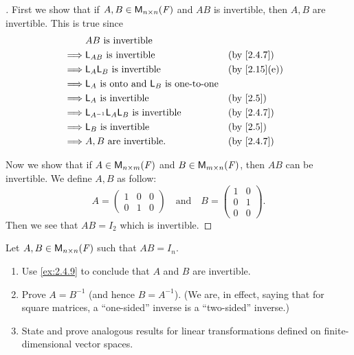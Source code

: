 \begin{proof}[]
  First we show that if \(A, B \in \mathsf{M}_{{n} \times n}({\mathit{F}})\) and \(AB\) is invertible, then \(A, B\) are invertible.
  This is true since
  \begin{align*}
             & AB \text{ is invertible}                                                             \\
    \implies & \L_{AB} \text{ is invertible}                        &  & \text{(by \cref{2.4.7})}   \\
    \implies & \L_A \L_B \text{ is invertible}                      &  & \text{(by \cref{2.15}(e))} \\
    \implies & \L_A \text{ is onto and } \L_B \text{ is one-to-one}                                 \\
    \implies & \L_A \text{ is invertible}                           &  & \text{(by \cref{2.5})}     \\
    \implies & \L_{A^{-1}} \L_A \L_B \text{ is invertible}          &  & \text{(by \cref{2.4.7})}   \\
    \implies & \L_B \text{ is invertible}                           &  & \text{(by \cref{2.5})}     \\
    \implies & A, B \text{ are invertible}.                         &  & \text{(by \cref{2.4.7})}
  \end{align*}

  Now we show that if \(A \in \mathsf{M}_{{n} \times m}({\mathit{F}})\) and \(B \in \mathsf{M}_{{m} \times n}({\mathit{F}})\), then \(AB\) can be invertible.
  We define \(A, B\) as follow:
  \[
    A = \begin{pmatrix}
      1 & 0 & 0 \\
      0 & 1 & 0
    \end{pmatrix} \quad \text{and} \quad B = \begin{pmatrix}
      1 & 0 \\
      0 & 1 \\
      0 & 0
    \end{pmatrix}.
  \]
  Then we see that \(AB = I_2\) which is invertible.
\end{proof}

\begin{ex}\label{ex:2.4.10}
  Let \(A, B \in \mathsf{M}_{{n} \times n}({\mathit{F}})\) such that \(AB = I_n\).
  \begin{enumerate}
    \item Use \cref{ex:2.4.9} to conclude that \(A\) and \(B\) are invertible.
    \item Prove \(A = B^{-1}\) (and hence \(B = A^{-1}\)).
          (We are, in effect, saying that for square matrices, a ``one-sided'' inverse is a ``two-sided'' inverse.)
    \item State and prove analogous results for linear transformations defined on finite-dimensional vector spaces.
  \end{enumerate}
\end{ex}

